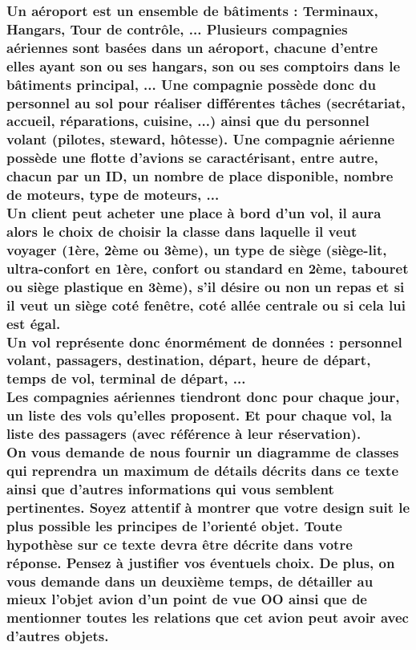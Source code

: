 \subsubsection[Fournir un diagramme de classes complet sur un aéroport]{Un aéroport est un ensemble de bâtiments : Terminaux, Hangars, Tour de contrôle, ... Plusieurs compagnies aériennes sont basées dans un aéroport, chacune d'entre elles ayant son ou ses hangars, son ou ses comptoirs dans le bâtiments principal, ... Une compagnie possède donc du personnel au sol pour réaliser différentes tâches (secrétariat, accueil, réparations, cuisine, ...) ainsi que du personnel volant (pilotes, steward, hôtesse). Une compagnie aérienne possède une flotte d'avions se caractérisant, entre autre, chacun par un ID, un nombre de place disponible, nombre de moteurs, type de moteurs, ...
\\Un client peut acheter une place à bord d'un vol, il aura alors le choix de choisir la classe dans laquelle il veut voyager (1ère, 2ème ou 3ème), un type de siège (siège-lit, ultra-confort en 1ère, confort ou standard en 2ème, tabouret ou siège plastique en 3ème), s'il désire ou non un repas et si il veut un siège coté fenêtre, coté allée centrale ou si cela lui est égal.
\\Un vol représente donc énormément de données : personnel volant, passagers, destination, départ, heure de départ, temps de vol, terminal de départ, ...
\\Les compagnies aériennes tiendront donc pour chaque jour, un liste des vols qu'elles proposent. Et pour chaque vol, la liste des passagers (avec référence à leur réservation).
\\On vous demande de nous fournir un diagramme de classes qui reprendra un maximum de détails décrits dans ce texte ainsi que d'autres informations qui vous semblent pertinentes. Soyez attentif à montrer que votre design suit le plus possible les principes de l'orienté objet. Toute hypothèse sur ce texte devra être décrite dans votre réponse. Pensez à justifier vos éventuels choix. De plus, on vous demande dans un deuxième temps, de détailler au mieux l'objet avion d'un point de vue OO ainsi que de mentionner toutes les relations que cet avion peut avoir avec d'autres objets.}
\begin{center}
    \color[rgb]{0,0.48,0.58}
\end{center}



